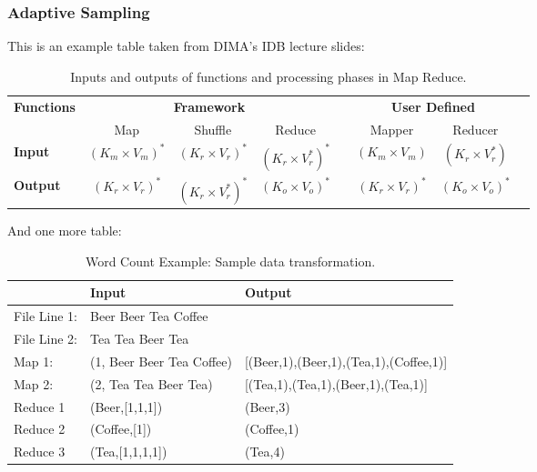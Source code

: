 \FloatBarrier

\subsubsection{Adaptive Sampling}
\label{sec:Adaptive Sampling}

This is an example table taken from DIMA's IDB lecture slides:

\begin{table}[h!]
  \begin{tabular}{lccccccc}
	\toprule    
    \hline
    \textbf{Functions} & \multicolumn{3}{c}{\textbf{Framework}} && \multicolumn{2}{c}{\textbf{User Defined}}\\
    \cmidrule{2-4}  \cmidrule{6-7}  
    & Map & Shuffle & Reduce && Mapper &  Reducer\\
    \midrule
    \textbf{Input} & $ (K_m \times V_m)^{*} $ & $ (K_r \times V_r)^{*} $ & $ (K_r \times V_r^{*})^{*} $ && $ (K_m \times V_m) $  & $ (K_r \times V_r^{*}) $\\
    \hline
    \textbf{Output} & $ (K_r \times V_r)^{*} $ & $ (K_r \times V_r^{*})^{*} $ & $ (K_o \times V_o)^{*} $ && $ (K_r \times V_r)^{*} $ & $ (K_o \times V_o)^{*} $\\
	\hline    
    \bottomrule
  \end{tabular}
  \caption{Inputs and outputs of functions and processing phases in Map Reduce.}
  \label{table:mapRedFunctions}
\end{table}

And one more table:

\begin{table}[h!]
  \centering
  \begin{tabular}{lll}
	\toprule    
    \hline
    & \textbf{Input} & \textbf{Output}\\
    \midrule
    File Line 1:& Beer Beer Tea Coffee &\\
    File Line 2:& Tea Tea Beer Tea &\\
	\hline
	Map 1: & (1, Beer Beer Tea Coffee) & [(Beer,1),(Beer,1),(Tea,1),(Coffee,1)]\\
    Map 2: & (2, Tea Tea Beer Tea)     & [(Tea,1),(Tea,1),(Beer,1),(Tea,1)]\\
    \hline
    Reduce 1 & (Beer,[1,1,1])  & (Beer,3)\\  
	Reduce 2 & (Coffee,[1])    & (Coffee,1)\\
	Reduce 3 & (Tea,[1,1,1,1]) & (Tea,4)\\
    \hline    
    \bottomrule
  \end{tabular}
  \caption{Word Count Example: Sample data transformation.}
  \label{table:wcDataTransformation}
\end{table}

